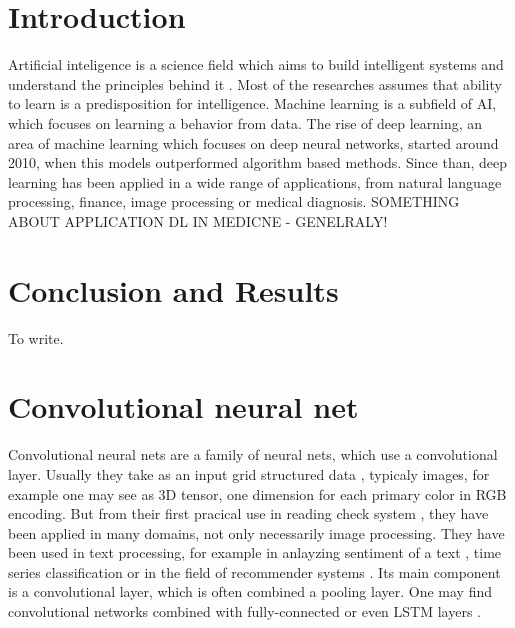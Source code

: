 \documentclass[twoside]{ctuthesis}
\theoremstyle{plain}
\theoremstyle{definition}
\theoremstyle{note}
\begin{document}
\maketitle


\chapter{Introduction}
Artificial inteligence is a science field which aims to build intelligent systems
and understand the principles behind it \cite{AIMAbook}. Most of the researches
assumes that ability to learn is a predisposition for intelligence. \cite{KONONENKO200189}
Machine learning is a subfield of AI, which focuses on learning a behavior from data.
The rise of deep learning, an area of machine learning which focuses on deep neural networks,
started around 2010, when this models outperformed algorithm based methods. 
Since than, deep learning has been applied in a wide range of applications, 
from natural language processing, finance, image processing or medical diagnosis.
SOMETHING ABOUT APPLICATION DL IN MEDICNE - GENELRALY!








\chapter{Conclusion and Results}
To write.


\appendix

\chapter{Convolutional neural net}
Convolutional neural nets are a family of neural nets, which use a convolutional layer.
Usually they take as an input grid structured data \cite{DL_BOOK}, typicaly images, for example
 one may see as 3D tensor, one dimension for each primary color in RGB encoding. But from their
 first pracical use in reading check system \cite{CHECKS}, they have been applied in many 
 domains, not only necessarily image processing. They have been used in text processing, for
 example in anlayzing sentiment of a text \cite{SENTIMENT_CNN}, time series classification 
\cite{TS_CNN} or in the field of recommender systems \cite{REC_CNN}. Its main component is a
convolutional layer, which is often combined a pooling layer. One may find convolutional 
networks combined with fully-connected or even LSTM layers \cite{LSTM_CNN}.
\end{document}
